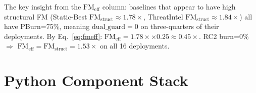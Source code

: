 \documentclass[12pt,a4paper]{article}
\newcommand{\FMeff}{\mathrm{FM}_{\mathrm{eff}}}
\newcommand{\FMst}{\mathrm{FM}_{\mathrm{struct}}}
\newcommand{\dg}{\mathrm{dual\_guard}}
\begin{document}
The key insight from the $\FMeff$ column: baselines that appear to have high structural
FM (Static-Best $\FMst{\approx}1.78\times$, ThreatIntel $\FMst{\approx}1.84\times$) all
have PBurn=75\%, meaning $\dg{=}0$ on three-quarters of their deployments.
By Eq.~\eqref{eq:fmeff}: $\FMeff = 1.78\times \times 0.25 \approx 0.45\times$.
RC2 burn=0\% $\Rightarrow$ $\FMeff = \FMst = 1.53\times$ on all 16 deployments.

\section{Python Component Stack}
\label{sec:components}
\end{document}

